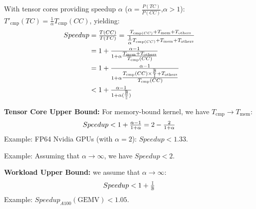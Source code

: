 With tensor cores providing speedup $\alpha$ ($\alpha=\tfrac{P(TC)}{P(CC)}$,$\alpha>1$): $T'_{\text{cmp}}(TC)=\tfrac{1}{\alpha}T_{\text{cmp}}(CC)$, yielding:
\begin{align}\footnotesize
Speedup&=\tfrac{T(CC)}{T(TC)} = \tfrac{T_{\text{cmp}(CC)}+T_{\text{mem}}+T_{\text{others}}}{\tfrac{1}{\alpha}T_{\text{cmp}(CC)}+T_{\text{mem}}+T_{\text{others}}} \\
&=1+\tfrac{{\alpha}-1}{1+{\alpha}\tfrac{T_{\text{mem}}+T_{\text{others}}}{T_{\text{cmp}}(CC)}} 
\\
&=1+\tfrac{{\alpha}-1}{1+{\alpha}\tfrac{T_{\text{cmp}}(CC)\times\tfrac{\mathbb{B}}{\mathbb{I}}+T_{\text{others}}}{T_{\text{cmp}}(CC)}} \\
&<1+\tfrac{\alpha-1}{1+\alpha(\tfrac{\mathbb{B}}{\mathbb{I}})}
\end{align}


\noindent\textbf{Tensor Core Upper Bound:} For memory-bound kernel, we have $T_{\text{cmp}}\to T_{\text{mem}}$:
\begin{align}\footnotesize
Speedup<1+\tfrac{\alpha-1}{1+\alpha}=2-\tfrac{2}{1+\alpha}
\end{align}
Example: FP64 Nvidia GPUs (with $\alpha=2$): $Speedup<1.33$.

\noindent Example: Assuming that $\alpha\to\infty$, we have $Speedup<2$.

\noindent\textbf{Workload Upper Bound:} we assume that $\alpha\to\infty$:
\begin{align}\footnotesize
Speedup <1+\tfrac{\mathbb{I}}{\mathbb{B}}
\end{align}
Example: $Speedup_{A100}(\text{GEMV})<1.05$.

